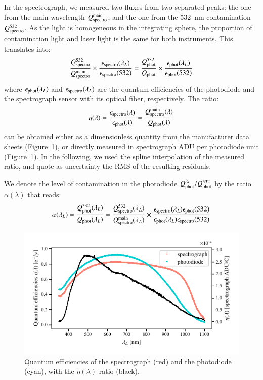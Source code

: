 In the spectrograph, we measured two fluxes from two separated peaks: the one from the main wavelength $Q_{\mathrm{spectro}}^{\mathrm{main}}$, and the one from the \SI{532}{\nm} contamination $Q_{\mathrm{spectro}}^{532}$. As the light is homogeneous in the integrating sphere, the proportion of contamination light and laser light is the same for  both instruments. This translates into:
\begin{equation}
    \frac{Q_{\mathrm{spectro}}^{532}}{Q_{\mathrm{spectro}}^{\mathrm{main}}} \times \frac{\epsilon_{\mathrm{spectro}}(\lambda_L)}{\epsilon_{\mathrm{spectro}}(532)} = \frac{Q_{\mathrm{phot}}^{532}}{Q_{\mathrm{phot}}} \times \frac{\epsilon_{\mathrm{phot}}(\lambda_L)}{\epsilon_{\mathrm{phot}}(532)}
    \label{eq:prev_alpha}
\end{equation}
where $\epsilon_{\mathrm{phot}}(\lambda_L)$ and $\epsilon_{\mathrm{spectro}}(\lambda_L)$ are the quantum efficiencies of the photodiode and the spectrograph sensor with its optical fiber, respectively. The ratio:
\begin{equation}\label{eq:eta}
\eta(\lambda) = \frac{\epsilon_{\mathrm{spectro}}(\lambda)}{\epsilon_{\mathrm{phot}}(\lambda)} = \frac{Q_{\mathrm{spectro}}^{\mathrm{main}}(\lambda)}{Q_{\mathrm{phot}}(\lambda)}
\end{equation}
can be obtained either as a dimensionless quantity from the manufacturer data sheets (Figure~\ref{fig:QEs}), or directly measured in spectrograph ADU per photodiode unit (Figure~\ref{fig:QEs}). In the following, we used the spline interpolation of the measured ratio, and quote as uncertainty the RMS of the resulting residuals.


We denote the level of contamination in the photodiode $Q_{\mathrm{phot}}^{\lambda_L}/Q_{\mathrm{phot}}^{532}$ by the ratio $\alpha(\lambda)$ that reads:
\begin{equation}
    \alpha(\lambda_L) = \frac{Q_{\mathrm{phot}}^{532}(\lambda_L)}{Q_{\mathrm{phot}}(\lambda_L)} = \frac{Q_{\mathrm{spectro}}^{532}(\lambda_L)}{Q_{\mathrm{spectro}}^{\mathrm{main}}(\lambda_L)} \times \frac{\epsilon_{\mathrm{spectro}}(\lambda_L)\epsilon_{\mathrm{phot}}(532)}{\epsilon_{\mathrm{phot}}(\lambda_L)\epsilon_{\mathrm{spectro}}(532)} 
    \label{eq:alpha}
\end{equation}

\begin{figure}[h]
    \centering
    \includegraphics[width=\columnwidth]{fig/qe_phototiode_spectro.pdf}
    \caption{Quantum efficiencies of the spectrograph (red) and the photodiode (cyan), with the $\eta(\lambda)$ ratio (black).}
    \label{fig:QEs}
\end{figure}
    
